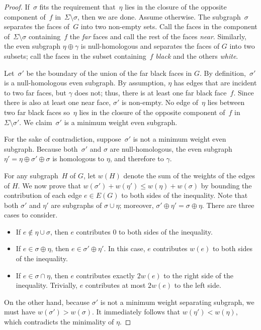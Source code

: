 \begin{proof}
If~$\sigma$ fits the requirement that~$\eta$ lies in the closure of the opposite component of~$f$ in~$\Sigma \setminus \sigma$, then we are done. Assume otherwise.
The subgraph~$\sigma$ separates the faces of~$G$ into two non-empty sets.  Call the faces in the component of~$\Sigma \setminus \sigma$ containing~$f$ the \emph{far} faces and call the rest of the faces  \emph{near}.  Similarly, the even subgraph $\eta \oplus \gamma$ is null-homologous and separates the faces of $G$ into two subsets; call the faces in the subset containing~$f$ \emph{black} and the others \emph{white}.

Let~$\sigma'$ be the boundary of the union of the far black faces in $G$.
By definition,~$\sigma'$ is a null-homologous even subgraph.  By assumption, $\eta$ has edges that are incident to two far faces, but $\gamma$ does not; thus, there is at least one far black face~$f$.  Since there is also at least one near face, $\sigma'$ is non-empty. 
No edge of~$\eta$ lies between two far black faces so~$\eta$ lies in the closure of the opposite component of~$f$ in~$\Sigma \setminus \sigma'$. We claim~$\sigma'$ is a minimum weight even subgraph.

For the sake of contradiction, suppose~$\sigma'$ is not a minimum weight even subgraph.
Because both~$\sigma'$ and $\sigma$ are null-homologous, the even subgraph $\eta' = \eta \oplus \sigma' \oplus \sigma$ is homologous to $\eta$, and therefore to $\gamma$.

For any subgraph~$H$ of $G$, let $w(H)$ denote the sum of the weights of the edges of $H$.  We now prove that $w(\sigma') + w(\eta') \leq w(\eta) + w(\sigma)$ by bounding the contribution of each edge $e \in E(G)$ to both sides of the inequality.  Note that both $\sigma'$ and $\eta'$ are subgraphs of $\sigma\cup \eta$; moreover, $\sigma' \oplus \eta' = \sigma \oplus \eta$.  There are three cases to consider.
\begin{itemize}
\item
If $e \not\in \eta \cup \sigma$, then $e$ contributes $0$ to both sides of the inequality.
\item
If $e \in \sigma \oplus \eta$, then $e \in \sigma' \oplus \eta'$.  In this case, $e$ contributes $w(e)$ to both sides of the inequality.
\item
If $e \in \sigma \cap \eta$, then $e$ contributes exactly $2w(e)$ to the right side of the inequality.  Trivially, $e$ contributes at most $2w(e)$ to the left side.
\end{itemize}

On the other hand, because $\sigma'$ is not a minimum weight separating subgraph, we must have $w(\sigma') > w(\sigma)$. 
It immediately follows that $w(\eta') < w(\eta)$, which contradicts the minimality of $\eta$.
\end{proof}

